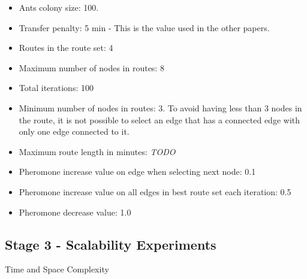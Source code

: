 \begin{itemize}
\item Ants colony size: 100.
\item Transfer penalty: 5 min - This is the value used in the other papers.
\item Routes in the route set: 4
\item Maximum number of nodes in routes: 8
\item Total iterations: 100
\item Minimum number of nodes in routes: 3. To avoid having less than 3 nodes in the route, it is not possible to select an edge that has a connected edge with only one edge connected to it.
\item Maximum route length in minutes: \emph{\color{red} TODO}
\item Pheromone increase value on edge when selecting next node: 0.1
\item Pheromone increase value on all edges in best route set each iteration: 0.5
\item Pheromone decrease value: 1.0
\end{itemize}

\subsection{Stage 3 -  Scalability Experiments}
Time and Space Complexity
